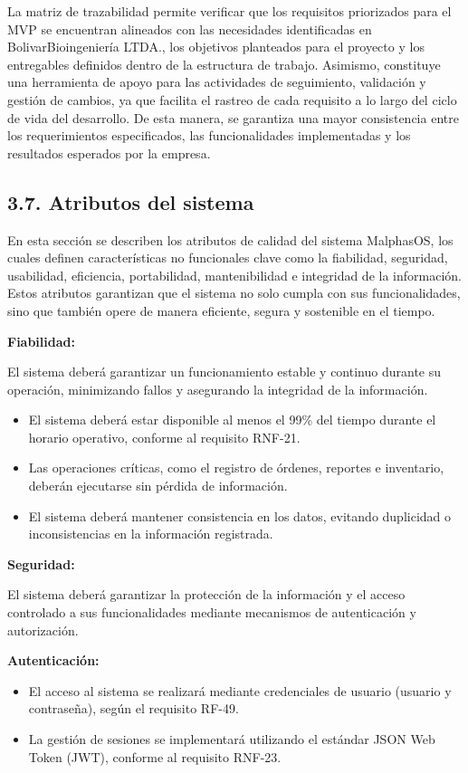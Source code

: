 \documentclass[12pt,a4paper]{article}
\newcommand{\subsectiontitle}[1]{%
  \subsection*{#1}
  \addcontentsline{toc}{subsection}{#1}
}
\begin{document}
La matriz de trazabilidad permite verificar que los requisitos priorizados para el MVP se encuentran alineados con las necesidades identificadas en BolivarBioingeniería LTDA., los objetivos planteados para el proyecto y los entregables definidos dentro de la estructura de trabajo. Asimismo, constituye una herramienta de apoyo para las actividades de seguimiento, validación y gestión de cambios, ya que facilita el rastreo de cada requisito a lo largo del ciclo de vida del desarrollo. De esta manera, se garantiza una mayor consistencia entre los requerimientos especificados, las funcionalidades implementadas y los resultados esperados por la empresa.

\subsectiontitle{3.7. Atributos del sistema}

En esta sección se describen los atributos de calidad del sistema MalphasOS, los cuales definen características no funcionales clave como la fiabilidad, seguridad, usabilidad, eficiencia, portabilidad, mantenibilidad e integridad de la información. Estos atributos garantizan que el sistema no solo cumpla con sus funcionalidades, sino que también opere de manera eficiente, segura y sostenible en el tiempo.

\textbf{Fiabilidad:}

El sistema deberá garantizar un funcionamiento estable y continuo durante su operación, minimizando fallos y asegurando la integridad de la información.

\begin{itemize}
  \item El sistema deberá estar disponible al menos el 99\% del tiempo durante el horario operativo, conforme al requisito RNF-21.

  \item Las operaciones críticas, como el registro de órdenes, reportes e inventario, deberán ejecutarse sin pérdida de información.

  \item El sistema deberá mantener consistencia en los datos, evitando duplicidad o inconsistencias en la información registrada.
\end{itemize}

\textbf{Seguridad:}

El sistema deberá garantizar la protección de la información y el acceso controlado a sus funcionalidades mediante mecanismos de autenticación y autorización.

\textbf{Autenticación:}

\begin{itemize}
  \item El acceso al sistema se realizará mediante credenciales de usuario (usuario y contraseña), según el requisito RF-49.

  \item La gestión de sesiones se implementará utilizando el estándar JSON Web Token (JWT), conforme al requisito RNF-23.
\end{itemize}
\end{document}
